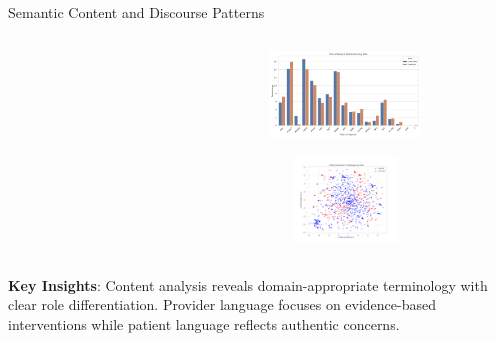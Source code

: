 \begin{frame}{Semantic Content and Discourse Patterns}
\begin{columns}
\begin{column}{0.33\textwidth}
    \end{column}
    
    \begin{column}{0.33\textwidth}
      \begin{minipage}{\textwidth}
        \includegraphics[width=0.95\textwidth, height=2.3cm]{images/analysis/plots_advanced/pos_distribution.png}
      \end{minipage}
      \vspace{0.3cm}
      
      \begin{minipage}{\textwidth}
        \includegraphics[width=0.95\textwidth, height=2.3cm]{images/analysis/plots_advanced/tsne_roles.png}
      \end{minipage}
    \end{column}
  \end{columns}
  \vspace{0.3cm}
  \footnotesize\textbf{Key Insights}: Content analysis reveals domain-appropriate terminology with clear role differentiation. Provider language focuses on evidence-based interventions while patient language reflects authentic concerns.
\end{frame}

